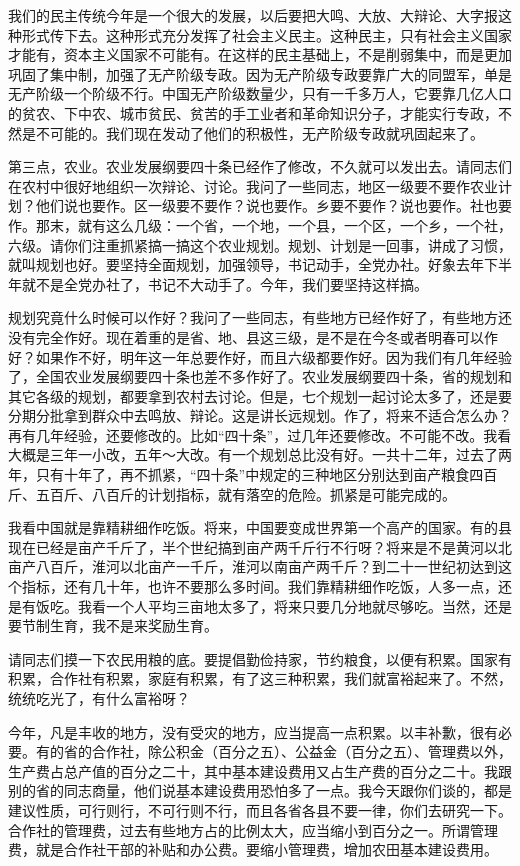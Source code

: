 我们的民主传统今年是一个很大的发展，以后要把大鸣、大放、大辩论、大字报这种形式传下去。这种形式充分发挥了社会主义民主。这种民主，只有社会主义国家才能有，资本主义国家不可能有。在这样的民主基础上，不是削弱集中，而是更加巩固了集中制，加强了无产阶级专政。因为无产阶级专政要靠广大的同盟军，单是无产阶级一个阶级不行。中国无产阶级数量少，只有一千多万人，它要靠几亿人口的贫农、下中农、城市贫民、贫苦的手工业者和革命知识分子，才能实行专政，不然是不可能的。我们现在发动了他们的积极性，无产阶级专政就巩固起来了。

第三点，农业。农业发展纲要四十条已经作了修改，不久就可以发出去。请同志们在农村中很好地组织一次辩论、讨论。我问了一些同志，地区一级要不要作农业计划？他们说也要作。区一级要不要作？说也要作。乡要不要作？说也要作。社也要作。那末，就有这么几级：一个省，一个地，一个县，一个区，一个乡，一个社，六级。请你们注重抓紧搞一搞这个农业规划。规划、计划是一回事，讲成了习惯，就叫规划也好。要坚持全面规划，加强领导，书记动手，全党办社。好象去年下半年就不是全党办社了，书记不大动手了。今年，我们要坚持这样搞。

规划究竟什么时候可以作好？我问了一些同志，有些地方已经作好了，有些地方还没有完全作好。现在着重的是省、地、县这三级，是不是在今冬或者明春可以作好？如果作不好，明年这一年总要作好，而且六级都要作好。因为我们有几年经验了，全国农业发展纲要四十条也差不多作好了。农业发展纲要四十条，省的规划和其它各级的规划，都要拿到农村去讨论。但是，七个规划一起讨论太多了，还是要分期分批拿到群众中去鸣放、辩论。这是讲长远规划。作了，将来不适合怎么办？再有几年经验，还要修改的。比如“四十条”，过几年还要修改。不可能不改。我看大概是三年一小改，五年～大改。有一个规划总比没有好。一共十二年，过去了两年，只有十年了，再不抓紧，“四十条”中规定的三种地区分别达到亩产粮食四百斤、五百斤、八百斤的计划指标，就有落空的危险。抓紧是可能完成的。

我看中国就是靠精耕细作吃饭。将来，中国要变成世界第一个高产的国家。有的县现在已经是亩产千斤了，半个世纪搞到亩产两千斤行不行呀？将来是不是黄河以北亩产八百斤，淮河以北亩产一千斤，淮河以南亩产两千斤？到二十一世纪初达到这个指标，还有几十年，也许不要那么多时间。我们靠精耕细作吃饭，人多一点，还是有饭吃。我看一个人平均三亩地太多了，将来只要几分地就尽够吃。当然，还是要节制生育，我不是来奖励生育。

请同志们摸一下农民用粮的底。要提倡勤俭持家，节约粮食，以便有积累。国家有积累，合作社有积累，家庭有积累，有了这三种积累，我们就富裕起来了。不然，统统吃光了，有什么富裕呀？

今年，凡是丰收的地方，没有受灾的地方，应当提高一点积累。以丰补歉，很有必要。有的省的合作社，除公积金（百分之五）、公益金（百分之五）、管理费以外，生产费占总产值的百分之二十，其中基本建设费用又占生产费的百分之二十。我跟别的省的同志商量，他们说基本建设费用恐怕多了一点。我今天跟你们谈的，都是建议性质，可行则行，不可行则不行，而且各省各县不要一律，你们去研究一下。合作社的管理费，过去有些地方占的比例太大，应当缩小到百分之一。所谓管理费，就是合作社干部的补贴和办公费。要缩小管理费，增加农田基本建设费用。

